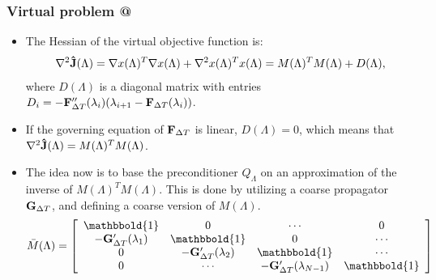 \documentclass[9pt]{beamer}
\makeatletter
\newcommand*{\rom}[1]{\expandafter\@slowromancap\romannumeral #1@}
\makeatother
\begin{document}
\begin{frame}
\frametitle{Virtual problem \rom{2}}
\begin{itemize}
\item{The Hessian of the virtual objective function is:
{\small
\begin{align*}
\nabla^2 \bold{\hat J}(\Lambda)= \nabla x(\Lambda)^T \nabla x(\Lambda) + \nabla^2 x(\Lambda)^Tx(\Lambda) = M(\Lambda)^TM(\Lambda) + D(\Lambda),
\end{align*}}
where {\tiny$D(\Lambda)$} is a diagonal matrix with entries {\tiny$D_i=-\bold{F}_{\Delta T}''(\lambda_i)(\lambda_{i+1}-\bold F_{\Delta T}(\lambda_i))$}.}
\item{If the governing equation of {\tiny$\bold F_{\Delta T}$} is linear, {\tiny$D(\Lambda)=0$}, which means that {\tiny$\nabla^2 \bold{\hat J}(\Lambda)= M(\Lambda)^TM(\Lambda)$}.}
\item{The idea now is to base the preconditioner $Q_{\Lambda}$ on an approximation of the inverse of {\tiny$M(\Lambda)^TM(\Lambda)$}. This is done by utilizing a coarse propagator {\tiny$\bold{G}_{\Delta T}$}, and defining a coarse version of $M(\Lambda)$.
{\tiny
\begin{align*}
\bar M(\Lambda)= \left[ \begin{array}{cccc}
   \mathbbold{1} & 0 & \cdots & 0 \\  
   -\bold{G}_{\Delta T}'(\lambda_{1}) & \mathbbold{1} & 0 & \cdots \\ 
   0 &-\bold{G}_{\Delta T}'(\lambda_{2}) & \mathbbold{1}  & \cdots \\
   0 &\cdots &-\bold{G}_{\Delta T}'(\lambda_{N-1}) & \mathbbold{1}  \\
   \end{array}  \right]
\end{align*}}}
\end{itemize}
\end{frame}
\end{document}

